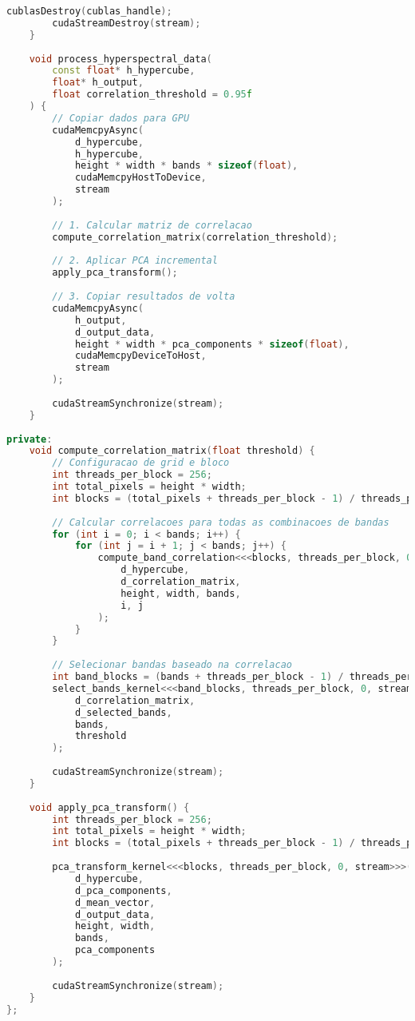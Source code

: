 \begin{lstlisting}[language=C++]
        cublasDestroy(cublas_handle);
        cudaStreamDestroy(stream);
    }
    
    void process_hyperspectral_data(
        const float* h_hypercube,
        float* h_output,
        float correlation_threshold = 0.95f
    ) {
        // Copiar dados para GPU
        cudaMemcpyAsync(
            d_hypercube, 
            h_hypercube, 
            height * width * bands * sizeof(float),
            cudaMemcpyHostToDevice,
            stream
        );
        
        // 1. Calcular matriz de correlacao
        compute_correlation_matrix(correlation_threshold);
        
        // 2. Aplicar PCA incremental
        apply_pca_transform();
        
        // 3. Copiar resultados de volta
        cudaMemcpyAsync(
            h_output,
            d_output_data,
            height * width * pca_components * sizeof(float),
            cudaMemcpyDeviceToHost,
            stream
        );
        
        cudaStreamSynchronize(stream);
    }
    
private:
    void compute_correlation_matrix(float threshold) {
        // Configuracao de grid e bloco
        int threads_per_block = 256;
        int total_pixels = height * width;
        int blocks = (total_pixels + threads_per_block - 1) / threads_per_block;
        
        // Calcular correlacoes para todas as combinacoes de bandas
        for (int i = 0; i < bands; i++) {
            for (int j = i + 1; j < bands; j++) {
                compute_band_correlation<<<blocks, threads_per_block, 0, stream>>>(
                    d_hypercube,
                    d_correlation_matrix,
                    height, width, bands,
                    i, j
                );
            }
        }
        
        // Selecionar bandas baseado na correlacao
        int band_blocks = (bands + threads_per_block - 1) / threads_per_block;
        select_bands_kernel<<<band_blocks, threads_per_block, 0, stream>>>(
            d_correlation_matrix,
            d_selected_bands,
            bands,
            threshold
        );
        
        cudaStreamSynchronize(stream);
    }
    
    void apply_pca_transform() {
        int threads_per_block = 256;
        int total_pixels = height * width;
        int blocks = (total_pixels + threads_per_block - 1) / threads_per_block;
        
        pca_transform_kernel<<<blocks, threads_per_block, 0, stream>>>(
            d_hypercube,
            d_pca_components,
            d_mean_vector,
            d_output_data,
            height, width,
            bands,
            pca_components
        );
        
        cudaStreamSynchronize(stream);
    }
};
\end{lstlisting}

